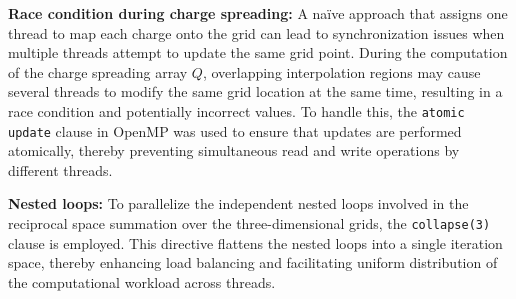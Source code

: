 \textbf{Race condition during charge spreading:} A naïve approach that assigns one thread to map each charge onto the grid can lead to synchronization issues when multiple threads attempt to update the same grid point. During the computation of the charge spreading array $Q$, overlapping interpolation regions may cause several threads to modify the same grid location at the same time, resulting in a race condition and potentially incorrect values. To handle this, the \verb|atomic update| clause in OpenMP was used to ensure that updates are performed atomically, thereby preventing simultaneous read and write operations by different threads.


\textbf{Nested loops:} To parallelize the independent nested loops involved in the reciprocal space summation over the three-dimensional grids, the \texttt{collapse(3)} clause is employed. This directive flattens the nested loops into a single iteration space, thereby enhancing load balancing and facilitating uniform distribution of the computational workload across threads.

